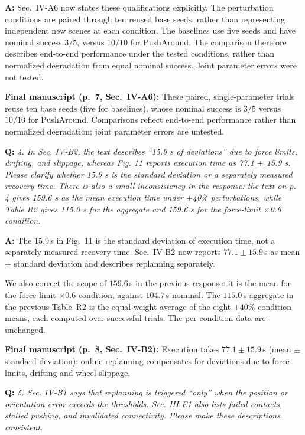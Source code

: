 \documentclass[11pt]{article}
\newcommand{\change}[1]{{\color{blue}#1}}
\begin{document}
\noindent \textbf{A:}
Sec.~IV-A6 now states these qualifications explicitly. The perturbation
conditions are paired through ten reused base seeds, rather than representing
independent new scenes at each condition. The baselines use five seeds and
have nominal success $3/5$, versus $10/10$ for PushAround. The comparison
therefore describes end-to-end performance under the tested conditions,
rather than normalized degradation from equal nominal success. Joint
parameter errors were not tested.
\par\smallskip\noindent\textbf{Final manuscript (p.~7, Sec.~IV-A6):}
\change{These paired, single-parameter trials reuse ten base seeds (five for
baselines), whose nominal success is $3/5$ versus $10/10$ for PushAround.
Comparisons reflect end-to-end performance rather than normalized
degradation; joint parameter errors are untested.}


\begin{shaded*}
\noindent \textbf{Q:}
{\itshape
4. In Sec. IV-B2, the text describes ``15.9 s of deviations'' due to force
limits, drifting, and slippage, whereas Fig. 11 reports execution time
as 77.1 $\pm$ 15.9 s. Please clarify whether 15.9 s is the standard
deviation or a separately measured recovery time. There is also a small
inconsistency in the response: the text on p. 4 gives 159.6 s as the
mean execution time under $\pm$40\% perturbations, while Table R2 gives
115.0 s for the aggregate and 159.6 s for the force-limit $\times$0.6
condition.
}
\end{shaded*}

\noindent \textbf{A:}
The $15.9$\,s in Fig.~11 is the standard deviation of execution time,
not a separately measured recovery time. Sec.~IV-B2 now reports
$77.1\pm15.9$\,s as mean $\pm$ standard deviation and describes replanning
separately.

We also correct the scope of $159.6$\,s in the previous response: it is the
mean for the force-limit $\times0.6$ condition, against $104.7$\,s nominal.
The $115.0$\,s aggregate in the previous Table~R2 is the equal-weight average
of the eight $\pm40\%$ condition means, each computed over successful trials.
The per-condition data are unchanged.
\par\smallskip\noindent\textbf{Final manuscript (p.~8, Sec.~IV-B2):}
\change{Execution takes $77.1\pm15.9$\,s (mean $\pm$ standard deviation);
online replanning compensates for deviations due to force limits,
drifting and wheel slippage.}


\begin{shaded*}
\noindent \textbf{Q:}
{\itshape
5. Sec. IV-B1 says that replanning is triggered ``only'' when the position
or orientation error exceeds the thresholds. Sec. III-E1 also lists
failed contacts, stalled pushing, and invalidated connectivity. Please
make these descriptions consistent.
}
\end{shaded*}
\end{document}
